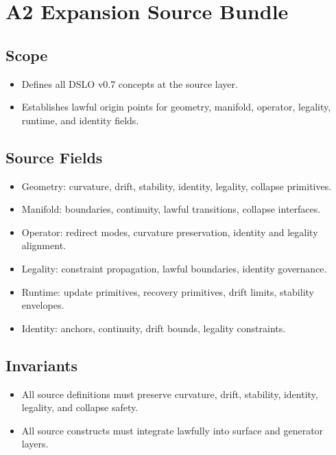 \section{A2 Expansion Source Bundle}

\subsection{Scope}
\begin{itemize}
    \item Defines all DSLO v0.7 concepts at the source layer.
    \item Establishes lawful origin points for geometry, manifold, operator, legality, runtime, and identity fields.
\end{itemize}

\subsection{Source Fields}
\begin{itemize}
    \item Geometry: curvature, drift, stability, identity, legality, collapse primitives.
    \item Manifold: boundaries, continuity, lawful transitions, collapse interfaces.
    \item Operator: redirect modes, curvature preservation, identity and legality alignment.
    \item Legality: constraint propagation, lawful boundaries, identity governance.
    \item Runtime: update primitives, recovery primitives, drift limits, stability envelopes.
    \item Identity: anchors, continuity, drift bounds, legality constraints.
\end{itemize}

\subsection{Invariants}
\begin{itemize}
    \item All source definitions must preserve curvature, drift, stability, identity, legality, and collapse safety.
    \item All source constructs must integrate lawfully into surface and generator layers.
\end{itemize}
